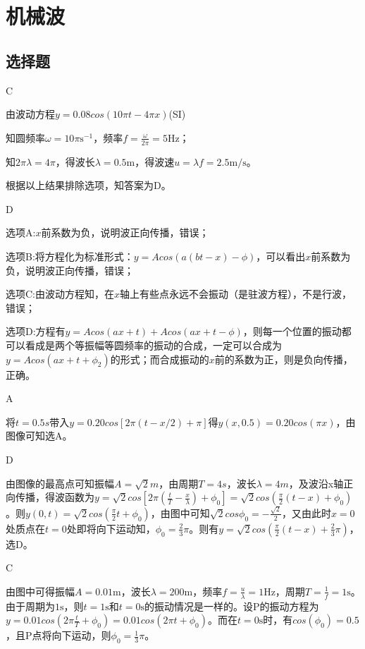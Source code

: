 \chapter{机械波}

\section{选择题}

\exercise C

\solve 由波动方程$y=0.08cos(10\pi t-4\pi x)$(SI)

知圆频率$\omega=10\pi\mathrm{s^{-1}}$，频率$f=\frac{\omega}{2 \pi}=5\mathrm{Hz}$；

知$2\pi\lambda=4\pi$，得波长$\lambda=0.5\mathrm{m}$，得波速$u=\lambda f=2.5\mathrm{m/s}$。

根据以上结果排除选项，知答案为D。

\exercise D

\solve 

选项A:$x$前系数为负，说明波正向传播，错误；

选项B:将方程化为标准形式：$y=Acos(a(bt-x)-\phi)$，可以看出$x$前系数为负，说明波正向传播，错误；

选项C:由波动方程知，在$x$轴上有些点永远不会振动（是驻波方程），不是行波，错误；

选项D:方程有$y=Acos(ax+t)+Acos(ax+t-\phi)$，则每一个位置的振动都可以看成是两个等振幅等圆频率的振动的合成，一定可以合成为$y=Acos(ax+t+\phi_2)$的形式；而合成振动的$x$前的系数为正，则是负向传播，正确。

\exercise A

\solve 将$t=0.5s$带入$y=0.20cos[2\pi (t-x/2)+\pi]$得$y(x,0.5)=0.20cos(\pi x)$，由图像可知选A。

\exercise D

\solve 由图像的最高点可知振幅$A=\sqrt{2}m$，由周期$T=4s$，波长$\lambda=4m$，及波沿x轴正向传播，得波函数为$y=\sqrt{2}cos[2\pi({\frac{t}{T}-\frac{x}{\lambda}})+\phi_0]=\sqrt{2}cos(\frac{\pi}{2}(t-x)+\phi_0)$。则$y(0,t)=\sqrt{2}cos(\frac{\pi}{2}t+\phi_0)$，由图中可知$\sqrt{2}cos\phi_0=-\frac{\sqrt{2}}{2}$，又由此时$x=0$处质点在$t=0$处即将向下运动知，$\phi_0=\frac{2}{3}\pi$。则有$y=\sqrt{2}cos(\frac{\pi}{2}(t-x)+\frac{2}{3}\pi)$，选D。

\exercise C

\solve  由图中可得振幅$A=0.01$m，波长$\lambda=200$m，频率$f=\frac{u}{\lambda}=1$Hz，周期$T=\frac{1}{f}=1\mathrm{s}$。由于周期为$1\mathrm{s}$，则$t=1\mathrm{s}$和$t=0\mathrm{s}$的振动情况是一样的。设P的振动方程为$y=0.01cos(2\pi\frac{t}{T}+\phi_0)=0.01cos(2\pi t+\phi_0)$。而在$t=0\mathrm{s}$时，有$cos(\phi_0)=0.5$，且P点将向下运动，则$\phi_0=\frac{1}{3}\pi$。

